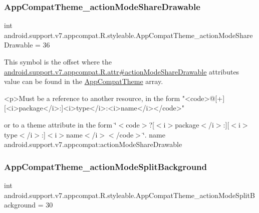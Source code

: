 \subsubsection{\texorpdfstring{App\+Compat\+Theme\+\_\+action\+Mode\+Share\+Drawable}{AppCompatTheme\_actionModeShareDrawable}}
{\footnotesize\ttfamily int android.\+support.\+v7.\+appcompat.\+R.\+styleable.\+App\+Compat\+Theme\+\_\+action\+Mode\+Share\+Drawable = 36\hspace{0.3cm}{\ttfamily [static]}}

This symbol is the offset where the \hyperlink{classandroid_1_1support_1_1v7_1_1appcompat_1_1R_1_1attr_a84010075b7707f56261c42ead124d7e4}{android.\+support.\+v7.\+appcompat.\+R.\+attr\#action\+Mode\+Share\+Drawable} attribute\textquotesingle{}s value can be found in the \hyperlink{classandroid_1_1support_1_1v7_1_1appcompat_1_1R_1_1styleable_a5c42f89e8a410c323be34208d75c430b}{App\+Compat\+Theme} array.

\begin{DoxyVerb}      <p>Must be a reference to another resource, in the form "<code>@[+][<i>package</i>:]<i>type</i>:<i>name</i></code>"
\end{DoxyVerb}
 or to a theme attribute in the form \char`\"{}$<$code$>$?\mbox{[}$<$i$>$package$<$/i$>$\+:\mbox{]}\mbox{[}$<$i$>$type$<$/i$>$\+:\mbox{]}$<$i$>$name$<$/i$>$$<$/code$>$\char`\"{}.  name android.\+support.\+v7.\+appcompat\+:action\+Mode\+Share\+Drawable \mbox{\label{classandroid_1_1support_1_1v7_1_1appcompat_1_1R_1_1styleable_a98ad62c525f3ba1cf67f00a6acd9f183}} 
\subsubsection{\texorpdfstring{App\+Compat\+Theme\+\_\+action\+Mode\+Split\+Background}{AppCompatTheme\_actionModeSplitBackground}}
{\footnotesize\ttfamily int android.\+support.\+v7.\+appcompat.\+R.\+styleable.\+App\+Compat\+Theme\+\_\+action\+Mode\+Split\+Background = 30\hspace{0.3cm}{\ttfamily [static]}}

